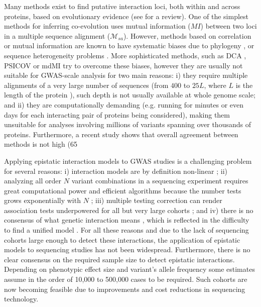 Many methods exist to find putative interaction loci, both within and across proteins, based on evolutionary evidence (see \cite{de2013emerging} for a review). One of the simplest methods for inferring co-evolution uses mutual information ($MI$) between two loci \cite{marks2012protein} in a multiple sequence alignment ($\mathcal{M}_{sa}$). However, methods based on correlation or mutual information are known to have systematic biases due to phylogeny \cite{de2013emerging}, or sequence heterogeneity problems \cite{weigt2009identification}. More sophisticated methods, such as DCA \cite{morcos2011direct}, PSICOV \cite{jones2012psicov} or mdMI \cite{clark2014multidimensional} try to overcome these biases, however they are usually not suitable for GWAS-scale analysis for two main reasons: i) they require multiple alignments of a very large number of sequences (from $400$ to $25L$, where $L$ is the length of the protein \cite{clark2014multidimensional}), such depth is not usually available at whole genome scale; and ii) they are computationally demanding (e.g. running for minutes or even days for each interacting pair of proteins being considered), making them unsuitable for analyses involving millions of variants spanning over thousands of proteins. Furthermore, a recent study shows that overall agreement between methods is not high (65%

Applying epistatic interaction models to GWAS studies is a challenging problem for several reasons: i) interaction models are by definition non-linear \cite{gao2010classification}; ii) analyzing all order $N$ variant combinations in a sequencing experiment requires great computational power and efficient algorithms because the number tests grows exponentially with $N$ \cite{phillips2008epistasis}; iii) multiple testing correction can render association tests underpowered for all but very large cohorts \cite{gao2010classification, phillips2008epistasis}; and iv) there is no consensus of what genetic interaction means \cite{mani2008defining}, which is reflected in the difficulty to find a unified model \cite{phillips2008epistasis,mani2008defining}. For all these reasons and due to the lack of sequencing cohorts large enough to detect these interactions, the application of epistatic models to sequencing studies has not been widespread. Furthermore, there is no clear consensus on the required sample size to detect epistatic interactions. Depending on phenotypic effect size and variant's allele frequency some estimates assume in the order of 10,000 to 500,000 cases \cite{jostins2013using} to be required. Such cohorts are now becoming feasible due to improvements and cost reductions in sequencing technology.

